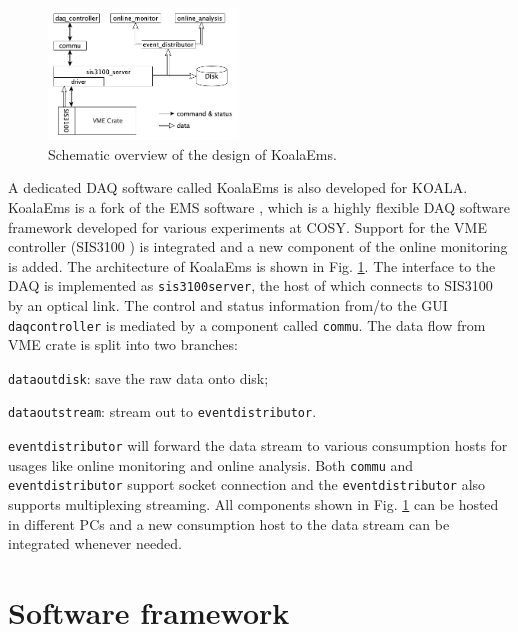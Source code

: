 \documentclass[number,5p]{elsarticle}
\begin{document}
\begin{figure}[htbp]
\centering
\includegraphics[width=0.45\textwidth]{./koalaems_deployment.png}
\caption{Schematic overview of the design of KoalaEms.}
\label{fig:koalaems}
\end{figure}

A dedicated DAQ software called KoalaEms is also developed for KOALA.
KoalaEms is a fork of the EMS software \cite{ems}, which is a highly flexible DAQ software framework developed for various experiments at COSY.
Support for the VME controller (SIS3100 \cite{sis}) is integrated and a new
component of the online monitoring is added.
The architecture of KoalaEms is shown in Fig. \ref{fig:koalaems}.
The interface to the DAQ is implemented as \texttt{sis3100\textunderscore server}, the host of which
connects to SIS3100 by an optical link.
The control and status information from/to the GUI \texttt{daq\textunderscore controller} is mediated by a component called \texttt{commu}.
The data flow from VME crate is split into two branches:
\begin{enumerate*}[label=(\roman*)]
\item \texttt{data\textunderscore out\textunderscore di\allowbreak sk}: save the raw data onto disk;
\item \texttt{data\textunderscore out\textunderscore stream}: stream out to \texttt{event\textunderscore distributor}.
\end{enumerate*}
\texttt{event\textunderscore distributor} will forward the data stream to various consumption hosts for usages like online monitoring and online analysis.
Both \texttt{commu} and \texttt{event\textunderscore distributor} support socket connection and the \texttt{event\textunderscore distributor} also supports multiplexing streaming.
All components shown in Fig. \ref{fig:koalaems} can be hosted in different PCs
and a new consumption host to the data stream can be integrated whenever needed.

\section{Software framework}
\label{sec:software}
\end{document}
